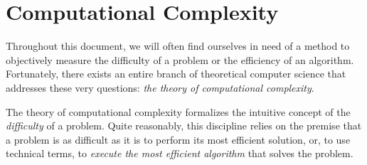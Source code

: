 \section{Computational Complexity}

    Throughout this document, we will often find ourselves in need of a method to objectively measure the difficulty of a problem or the efficiency of an algorithm. Fortunately, there exists an entire branch of theoretical computer science that addresses these very questions: \emph{the theory of computational complexity}.

    The theory of computational complexity formalizes the intuitive concept of the \emph{difficulty} of a problem. Quite reasonably, this discipline relies on the premise that a problem is as difficult as it is to perform its most efficient solution, or, to use technical terms, to \emph{execute the most efficient algorithm} that solves the problem.

    
    
    